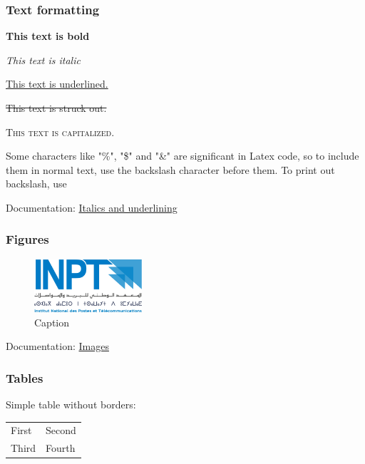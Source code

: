 \subsubsection{Text formatting}

\textbf{This text is bold}

\textit{This text is italic}

\underline{This text is underlined.}

\st{This text is struck out.}

\textsc{This text is capitalized.}



Some characters like "\%", "\$" and "\&" are significant in Latex code, so to include them in normal text, use the backslash character before them.
To print out backslash, use 


Documentation: \href{https://www.overleaf.com/learn/latex/Bold%2C_italics_and_underlining}{Italics and underlining}


\subsubsection{Figures} 

\begin{figure}[H] 
    \centering
    \includegraphics[width=4cm]{Logos/Logo_INPT.png}
    \caption{Caption}
\end{figure}



Documentation: \href{https://www.overleaf.com/learn/latex/Inserting_Images}{Images}


\subsubsection{Tables} 

Simple table without borders:
\\

\begin{tabular}{ll}
  First & Second \\
  Third & Fourth
\end{tabular}
\\

